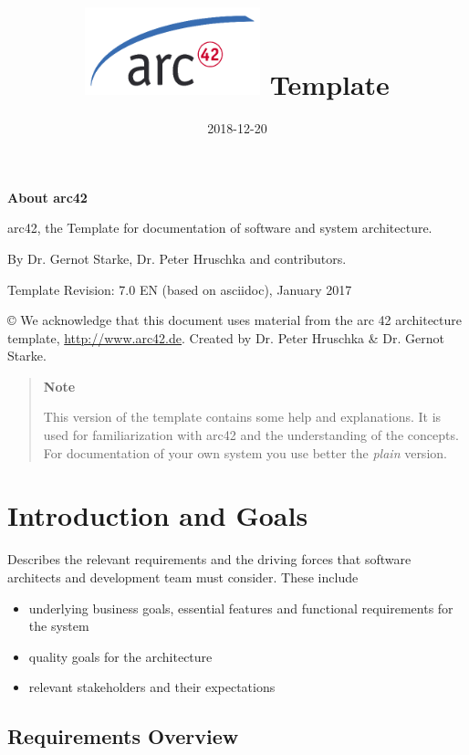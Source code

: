 \documentclass[]{article}
\title{\includegraphics{images/arc42-logo.png} Template}
\date{2018-12-20}
\begin{document}
\maketitle

\section{}

\textbf{About arc42}

arc42, the Template for documentation of software and system
architecture.

By Dr. Gernot Starke, Dr. Peter Hruschka and contributors.

Template Revision: 7.0 EN (based on asciidoc), January 2017

© We acknowledge that this document uses material from the arc 42
architecture template, \url{http://www.arc42.de}. Created by Dr. Peter
Hruschka \& Dr. Gernot Starke.

\begin{quote}
\textbf{Note}

This version of the template contains some help and explanations. It is
used for familiarization with arc42 and the understanding of the
concepts. For documentation of your own system you use better the
\emph{plain} version.
\end{quote}

\hypertarget{section-introduction-and-goals}{%
\section{Introduction and Goals}\label{section-introduction-and-goals}}

Describes the relevant requirements and the driving forces that software
architects and development team must consider. These include

\begin{itemize}
\item
  underlying business goals, essential features and functional
  requirements for the system
\item
  quality goals for the architecture
\item
  relevant stakeholders and their expectations
\end{itemize}

\hypertarget{_requirements_overview}{%
\subsection{Requirements Overview}\label{_requirements_overview}}
\end{document}
